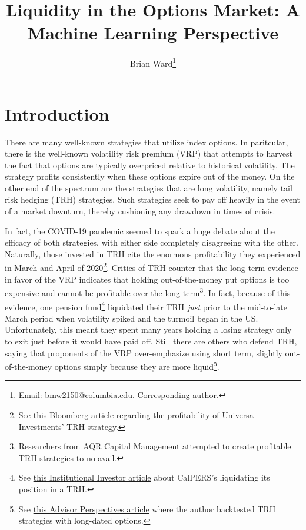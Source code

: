\documentclass[12pt]{article}
\numberwithin{theorem}{section}
\numberwithin{equation}{section}
\numberwithin{remark}{section}
\numberwithin{definition}{section}
\numberwithin{theorem}{section}
\numberwithin{lemma}{section}
\numberwithin{example}{section}
\begin{document}
\title{Liquidity in the Options Market: A Machine Learning Perspective}
\author{Brian Ward\thanks{Email: {bmw2150@columbia.edu}. Corresponding author. }} 
\maketitle
{}

\tableofcontents

\newpage

\setcounter{section}{0}

\section{Introduction}
There are many well-known strategies that utilize index options. In paritcular, there is the well-known volatility risk premium (VRP) that attempts to harvest the fact that options are typically overpriced relative to historical volatility. The strategy profits consistently when these options expire out of the money. On the other end of the spectrum are the strategies that are long volatility, namely tail risk hedging (TRH) strategies. Such strategies seek to pay off heavily in the event of a market downturn, thereby cushioning any drawdown in times of crisis. 

In fact, the COVID-19 pandemic seemed to spark a huge debate about the efficacy of both strategies, with either side completely disagreeing with the other. Naturally, those invested in TRH cite the enormous  profitability they experienced in March and April of 2020\footnote{See \href{https://www.bloomberg.com/news/articles/2020-04-08/taleb-advised-universa-tail-risk-fund-returned-3-600-in-march}{this Bloomberg article} regarding the profitability of Universa Investments' TRH strategy.}. Critics of TRH counter that the long-term evidence in favor of the VRP indicates that holding out-of-the-money put options is too expensive and cannot be profitable over the long term\footnote{Researchers from AQR Capital Management \href{https://www.aqr.com/Insights/Research/Alternative-Thinking/Portfolio-Protection-Its-a-Long-Term-Story}{attempted to create profitable} TRH strategies to no avail.}. In fact, because of this evidence, one pension fund\footnote{See \href{https://www.institutionalinvestor.com/article/b1l65mvpw5xpts/The-Inside-Story-of-CalPERS-Untimely-Tail-Hedge-Unwind}{this Institutional Investor article} about CalPERS's liquidating its position in a TRH.} liquidated their TRH \emph{just} prior to the mid-to-late March period when volatility spiked and the turmoil began in the US. Unfortunately, this meant they spent many years holding a losing strategy only to exit just before it would have paid off. Still there are others who defend TRH, saying that proponents of the VRP over-emphasize using short term, slightly out-of-the-money options simply because they are more liquid\footnote{See \href{https://www.advisorperspectives.com/articles/2020/07/13/empirical-support-for-tail-risk-strategies}{this Advisor Perspectives article} where the author backtested TRH strategies with long-dated options.}. 
\end{document}

